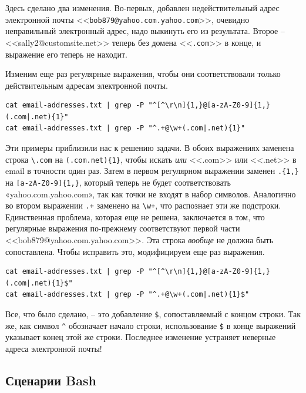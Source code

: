 \documentclass[12pt]{article}
\begin{document}
Здесь сделано два изменения. Во-первых, добавлен недействительный адрес
электронной почты
<<\texttt{bob879@yahoo.com.yahoo.com}>>,
очевидно неправильный электронный адрес, надо выкинуть его из
результата. Второе --
<<sally2@customsite.net>>
теперь без домена <<\texttt{.com}>> в конце, и выражение его теперь не находит.

Изменим еще раз регулярные выражения, чтобы они соответствовали только
действительным адресам электронной почты.
\begin{verbatim}
cat email-addresses.txt | grep -P "^[^\r\n]{1,}@[a-zA-Z0-9]{1,}(.com|.net){1}"
cat email-addresses.txt | grep -P "^.+@\w+(.com|.net){1}"
\end{verbatim}

Эти примеры приблизили нас к решению задачи. В обоих выражениях заменена
строка \texttt{\textbackslash{}.com} на
\texttt{(.com\textbar{}.net)\{1\}}, чтобы искать \emph{или} <<.com>> или
<<.net>> в email в точности один раз. Затем в первом регулярном
выражении заменен \texttt{.\{1,\}} на \texttt{{[}a-zA-Z0-9{]}\{1,\}},
который теперь не будет соответствовать «yahoo.com.yahoo.com», так как
точки не входят в набор символов. Аналогично во втором выражении
\texttt{.+} заменено на \texttt{\textbackslash{}w+}, что распознает эти
же подстроки. Единственная проблема, которая еще не решена, заключается в
том, что регулярные выражения по-прежнему соответствуют первой части
<<bob879@yahoo.com.yahoo.com>>.
Эта строка \emph{вообще} не должна быть сопоставлена. Чтобы исправить
это, модифицируем еще раз выражения.
\begin{verbatim}
cat email-addresses.txt | grep -P "^[^\r\n]{1,}@[a-zA-Z0-9]{1,}(.com|.net){1}$"
cat email-addresses.txt | grep -P "^.+@\w+(.com|.net){1}$"
\end{verbatim}

Все, что было сделано, -- это добавление \texttt{\$}, сопоставляемый с
концом строки. Так же, как символ \texttt{\^{}} обозначает начало
строки, использование \texttt{\$} в конце выражений указывает конец этой
же строки. Последнее изменение устраняет неверные адреса электронной
почты!

\hypertarget{Bash-Scripting}{%
\subsection{\texorpdfstring{\protect\hyperlink{Bash-Scripting}{}Сценарии
Bash}{Сценарии Bash}}\label{Bash-Scripting}}
\end{document}
